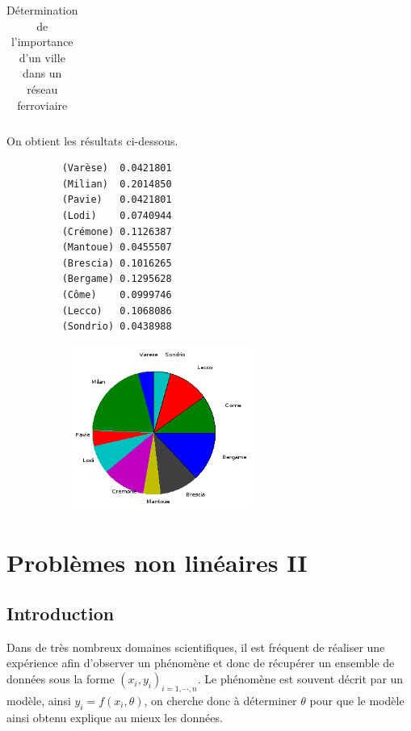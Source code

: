 \documentclass[a4paper,10pt]{report}
\begin{document}
\begin{table}[H]
\caption{Détermination de l'importance d'un ville dans un réseau ferroviaire}
\begin{tabular}{l}

\label{italie}
\end{tabular}
\end{table}

On obtient les résultats ci-dessous.
\begin{figure}[H]
\begin{minipage}[c]{.40\linewidth}
\begin{verbatim}
    (Varèse)  0.0421801  
    (Milian)  0.2014850  
    (Pavie)   0.0421801  
    (Lodi)    0.0740944  
    (Crémone) 0.1126387  
    (Mantoue) 0.0455507  
    (Brescia) 0.1016265  
    (Bergame) 0.1295628  
    (Côme)    0.0999746  
    (Lecco)   0.1068086  
    (Sondrio) 0.0438988 
\end{verbatim}
\end{minipage} \hfill
\begin{minipage}[c]{.58\linewidth}
\begin{figure}[H]
   \includegraphics[width=6cm]{diag_italiennes.png}
   \end{figure}
\end{minipage}
\end{figure}

\chapter{Problèmes non linéaires II}
\section{Introduction}
Dans de très nombreux domaines scientifiques, il est fréquent de réaliser une expérience afin d'observer un phénomène et donc de récupérer un ensemble de données sous la forme $(x_i,y_i)_{i=1,\cdots,n}$. Le phénomène est souvent décrit par un modèle, ainsi $y_i=f(x_i,\theta)$, on cherche donc à déterminer $\theta$ pour que le modèle ainsi obtenu explique au mieux les données. \\
\end{document}
